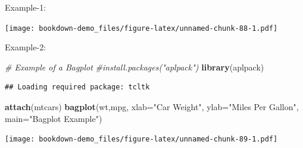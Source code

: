 \documentclass[]{book}
\newenvironment{Shaded}{\begin{snugshade}}{\end{snugshade}}
\newcommand{\KeywordTok}[1]{\textcolor[rgb]{0.13,0.29,0.53}{\textbf{#1}}}
\newcommand{\DataTypeTok}[1]{\textcolor[rgb]{0.13,0.29,0.53}{#1}}
\newcommand{\DecValTok}[1]{\textcolor[rgb]{0.00,0.00,0.81}{#1}}
\newcommand{\StringTok}[1]{\textcolor[rgb]{0.31,0.60,0.02}{#1}}
\newcommand{\CommentTok}[1]{\textcolor[rgb]{0.56,0.35,0.01}{\textit{#1}}}
\newcommand{\OperatorTok}[1]{\textcolor[rgb]{0.81,0.36,0.00}{\textbf{#1}}}
\newcommand{\NormalTok}[1]{#1}
\begin{document}
Example-1:

\begin{Shaded}
\end{Shaded}

\texttt{[image: bookdown-demo\_files/figure-latex/unnamed-chunk-88-1.pdf]}

Example-2:

\begin{Shaded}
\begin{Highlighting}[]
\CommentTok{# Example of a Bagplot}
\CommentTok{#install.packages("aplpack")}
\KeywordTok{library}\NormalTok{(aplpack)}
\end{Highlighting}
\end{Shaded}

\begin{verbatim}
## Loading required package: tcltk
\end{verbatim}

\begin{Shaded}
\begin{Highlighting}[]
\KeywordTok{attach}\NormalTok{(mtcars)}
\KeywordTok{bagplot}\NormalTok{(wt,mpg, }\DataTypeTok{xlab=}\StringTok{"Car Weight"}\NormalTok{, }\DataTypeTok{ylab=}\StringTok{"Miles Per Gallon"}\NormalTok{,}
  \DataTypeTok{main=}\StringTok{"Bagplot Example"}\NormalTok{)}
\end{Highlighting}
\end{Shaded}

\texttt{[image: bookdown-demo\_files/figure-latex/unnamed-chunk-89-1.pdf]}
\end{document}

